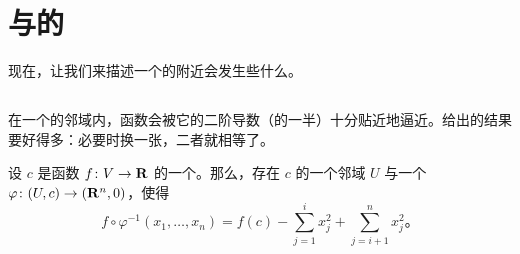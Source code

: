 \section{\trMorseLemma{}与\trCriticalPoint{}的\trIndex}
\label{sec:the-morse-lemma-index}

现在，让我们来描述一个\trMorseFunction{}的\trCriticalPoint{}附近会发生些什么。

\subsection{\trMorseLemma}
\label{subsec:the-morse-lemma}

在一个\trCriticalPoint{}的邻域内，函数会被它的二阶导数（的一半）十分贴近地逼近。\trMorseLemma{}给出的结果要好得多：必要时换一张\trChart，二者就相等了。

\begin{theorem}[\trMorseLemma]\label{thm:morse-lemma}
设 $c$ 是函数 $f\colon V\to\mathbf{R}$ 的一个\trNondegenerate\trCriticalPoint。那么，存在 $c$ 的一个邻域 $U$ 与一个\trDiffeomorphism{} $\varphi\colon(U,c)\to(\mathbf{R}^n,0)$，使得
\[
f\circ\varphi^{-1}(x_1,\dotsc,x_n)
  =f(c)-\sum_{j=1}^{i}x_j^2+\sum_{j=i+1}^{n}x_j^2\text{。}
\]
\end{theorem}

